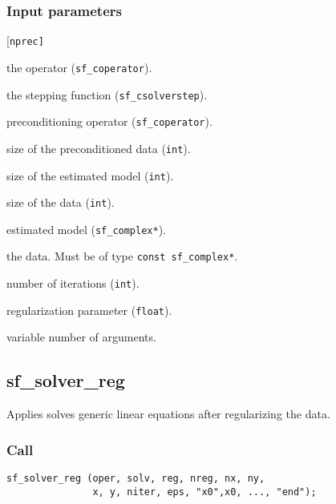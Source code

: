 \subsubsection*{Input parameters}
\begin{desclist}{\tt }{\quad}[\tt nprec]
   \setlength\itemsep{0pt}
   \item[oper]  the operator (\texttt{sf\_coperator}).  
   \item[solv]  the stepping function (\texttt{sf\_csolverstep}).  
   \item[prec]  preconditioning operator (\texttt{sf\_coperator}).  
   \item[nprec] size of the preconditioned data (\texttt{int}).  
   \item[nx]    size of the estimated model  (\texttt{int}).  
   \item[ny]    size of the data  (\texttt{int}).  
   \item[x]     estimated model  (\texttt{sf\_complex*}).  
   \item[dat]   the data. Must be of type \texttt{const sf\_complex*}.  
   \item[niter] number of iterations (\texttt{int}).  
   \item[eps]   regularization parameter (\texttt{float}).  
   \item[...]   variable number of arguments.
\end{desclist}





\subsection{{sf\_solver\_reg}}
Applies solves generic linear equations after regularizing the data.

\subsubsection*{Call}
\begin{verbatim}
sf_solver_reg (oper, solv, reg, nreg, nx, ny,
               x, y, niter, eps, "x0",x0, ..., "end");
\end{verbatim}

